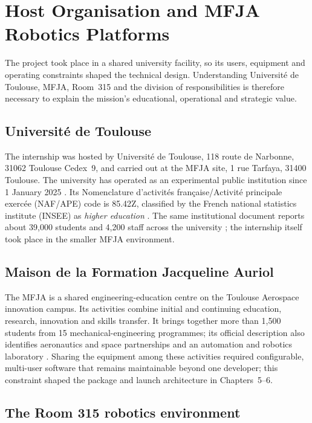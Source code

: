 \chapter{Host Organisation and MFJA Robotics Platforms}
\label{chap:host}

The project took place in a shared university facility, so its users, equipment
and operating constraints shaped the technical design. Understanding
Universit\'e de Toulouse, MFJA, Room~315 and the division of responsibilities is
therefore necessary to explain the mission's educational, operational and
strategic value.

\section{Université de Toulouse}

The internship was hosted by Université de Toulouse, 118 route de Narbonne,
31062 Toulouse Cedex~9, and carried out at the MFJA site, 1 rue Tarfaya, 31400
Toulouse. The university has operated as an
experimental public institution since 1 January 2025
\citep[p.~5]{univtoulousefigures}. Its Nomenclature d'activités
française/Activité principale exercée (NAF/APE) code is 85.42Z, classified by
the French national statistics institute (INSEE) as \emph{higher education}
\citep{univtoulousesirene,insee8542z}. The same institutional document reports
about 39,000 students and 4,200 staff across the university
\citep[p.~5]{univtoulousefigures}; the internship itself took place in the
smaller MFJA environment.

\section{Maison de la Formation Jacqueline Auriol}

The MFJA is a shared engineering-education centre on the Toulouse Aerospace
innovation campus. Its activities combine initial and continuing education,
research, innovation and skills transfer. It brings together more than 1,500
students from 15 mechanical-engineering programmes; its official description
also identifies aeronautics and space partnerships and an automation and
robotics laboratory \citep{mfjaofficial}. Sharing the equipment among these
activities required configurable, multi-user software that remains maintainable
beyond one developer; this constraint shaped the package and launch architecture
in Chapters~5--6.

\section{The Room 315 robotics environment}

